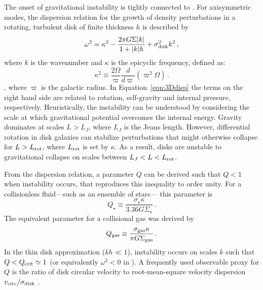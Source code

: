 \IfFileExists{emulateapjlegacy.cls}{\documentclass[iop]{emulateapjlegacy}}{\documentclass[iop]{emulateapj}}
\def\altomega{\varpi}
\begin{document}
The onset of gravitational instability is tightly connected to \SF
\citep[e.g.,][]{Kennicutt89a, Martin01, Wang94a, Li05b, Li06a}. For axisymmetric modes, the dispersion relation for the growth of density perturbations in a rotating, turbulent disk of finite thickness $h$ is described by
\begin{equation}
\omega^2 = \kappa^2 - \frac{2\pi G \Sigma |k|}{1 + |k| h} + \sigma_{\rm disk}^2 k^2\,,
\label{eqn:3Ddisp}
\end{equation}
where $k$ is the wavenumber and $\kappa$ is the epicyclic frequency, defined as:
\begin{equation}
\kappa^2\equiv\frac{2\Omega}{\altomega}\frac{d}{d\altomega}\left(\altomega^2\Omega\right)\,.
\label{eqn:kappa}
\end{equation}
\citep{Romeo92a},
where $\altomega$ is the galactic radius.
In Equation~\ref{eqn:3Ddisp} the terms on the right hand side are related to rotation, self-gravity and internal pressure, respectively. Heuristically, the instability can be understood by considering the scale at which gravitational potential overcomes the internal energy. Gravity dominates at scales $L > L_J$, where $L_J$ is the Jeans length. However, differential rotation in disk galaxies can stabilize perturbations that might otherwise collapse for $L > L_{\rm rot}$, where $L_{\rm rot}$ is set by $\kappa$. As a result, disks are unstable to gravitational collapse on scales between $L_J < L < L_{\rm rot}$.

From the dispersion relation, a parameter $Q$ can be derived such that $Q < 1$ when instability occurs, that reproduces this inequality to order unity. For a collisionless fluid---such as an ensemble of stars--- this parameter is \citep{Toomre64a}
\begin{equation}
Q_{\star} \equiv\frac{\sigma_{\star}\kappa}{3.36 G \Sigma_{\star}}\,.
\end{equation}
The equivalent parameter for a collisional gas was derived by \citet{Goldreich65a}
\begin{equation}
Q_{\rm gas}\equiv\frac{\sigma_{\rm gas}\kappa}{\pi G \Sigma_{\rm gas}}\,.
\label{eqn:Q}
\end{equation}
In the thin disk approximation ($kh\ll1$), instability occurs on scales $k$ such that $Q < Q_{\rm crit}\simeq1$ (or equivalently $\omega^2 < 0$ in ). A frequently used observable proxy for $Q$ is the ratio of disk circular velocity to root-mean-square velocity dispersion $v_{\rm circ}/\sigma_{\rm disk}$ \citep[e.g.,][]{GarciaBurillo03a, Genzel11a, Kassin12a, Leung19a}.
%
\end{document}
